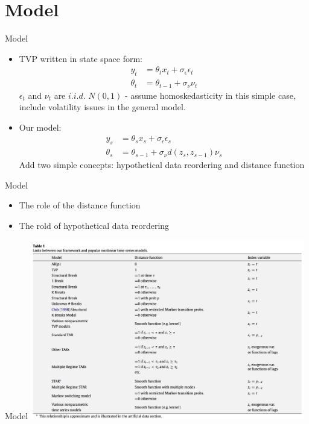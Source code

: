 \documentclass[dvipsnames,mathserif]{beamer}
\begin{document}
{\section{Model}
\begin{frame}{Model}
    \begin{itemize}
        \item TVP written in state space form:\\
            \begin{align}
            y_t &= \theta_tx_t + \sigma_\epsilon\epsilon_t\\
            \theta_t &= \theta_{t-1} + \sigma_\nu\nu_t
            \end{align}
        $\epsilon_t$ and $\nu_t$ are $i.i.d.$ $N(0,1)$ - assume homoskedasticity in this simple case, include volatility issues in the general model.
        \item Our model:\\
            \begin{align}
            y_s &= \theta_sx_s + \sigma_\epsilon\epsilon_s\\
            \theta_s &= \theta_{s-1} + \sigma_\nu d(z_s, z_{s-1})\nu_s
            \end{align}
        Add two simple concepts: hypothetical data reordering and distance function
    \end{itemize}

\end{frame}
\begin{frame}{Model}
    \begin{itemize}
        \item The role of the distance function
        \item The rold of hypothetical data reordering
    \end{itemize}
\end{frame}
\begin{frame}{Model}
\includegraphics[width = 0.9\textwidth]{model.png}
\end{frame}

}
\end{document}

